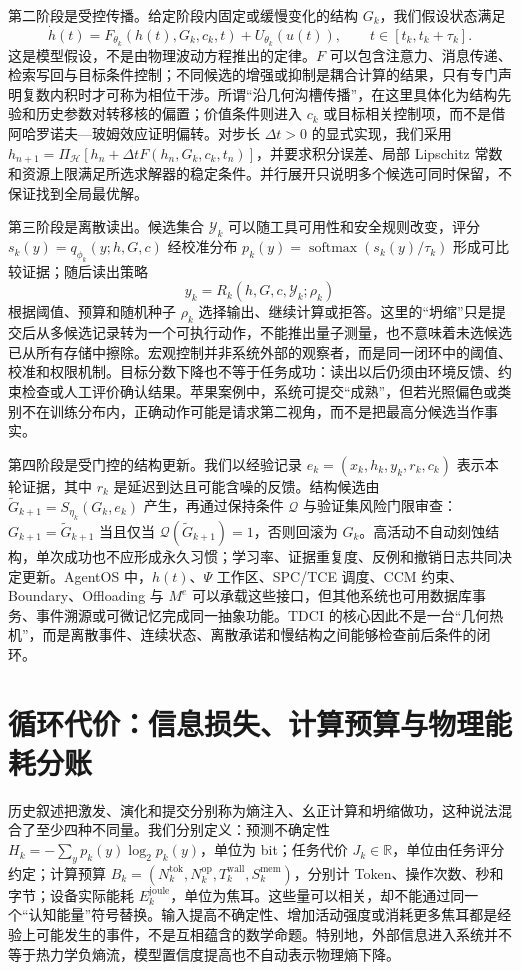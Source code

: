 第二阶段是受控传播。给定阶段内固定或缓慢变化的结构 $G_k$，我们假设状态满足
\[
\dot h(t)=F_{\theta_k}\!\left(h(t),G_k,c_k,t\right)+U_{\theta_k}\!\left(u(t)\right),
\qquad t\in[t_k,t_k+\tau_k].
\]
这是模型假设，不是由物理波动方程推出的定律。$F$ 可以包含注意力、消息传递、检索写回与目标条件控制；不同候选的增强或抑制是耦合计算的结果，只有专门声明复数内积时才可称为相位干涉。所谓“沿几何沟槽传播”，在这里具体化为结构先验和历史参数对转移核的偏置；价值条件则进入 $c_k$ 或目标相关控制项，而不是借阿哈罗诺夫—玻姆效应证明偏转。对步长 $\Delta t>0$ 的显式实现，我们采用 $h_{n+1}=\Pi_{\mathcal H}[h_n+\Delta t F(h_n,G_k,c_k,t_n)]$，并要求积分误差、局部 Lipschitz 常数和资源上限满足所选求解器的稳定条件。并行展开只说明多个候选可同时保留，不保证找到全局最优解。

第三阶段是离散读出。候选集合 $\mathcal{Y}_k$ 可以随工具可用性和安全规则改变，评分 $s_k(y)=q_{\phi_k}(y;h,G,c)$ 经校准分布 $p_k(y)=\operatorname{softmax}(s_k(y)/\tau_k)$ 形成可比较证据；随后读出策略
\[
y_k=R_k(h,G,c,\mathcal{Y}_k;\rho_k)
\]
根据阈值、预算和随机种子 $\rho_k$ 选择输出、继续计算或拒答。这里的“坍缩”只是提交后从多候选记录转为一个可执行动作，不能推出量子测量，也不意味着未选候选已从所有存储中擦除。宏观控制并非系统外部的观察者，而是同一闭环中的阈值、校准和权限机制。目标分数下降也不等于任务成功：读出以后仍须由环境反馈、约束检查或人工评价确认结果。苹果案例中，系统可提交“成熟”，但若光照偏色或类别不在训练分布内，正确动作可能是请求第二视角，而不是把最高分候选当作事实。

第四阶段是受门控的结构更新。我们以经验记录 $e_k=(x_k,h_k,y_k,r_k,c_k)$ 表示本轮证据，其中 $r_k$ 是延迟到达且可能含噪的反馈。结构候选由 $\widetilde G_{k+1}=S_{\eta_k}(G_k,e_k)$ 产生，再通过保持条件 $\mathcal{Q}$ 与验证集风险门限审查：$G_{k+1}=\widetilde G_{k+1}$ 当且仅当 $\mathcal{Q}(\widetilde G_{k+1})=1$，否则回滚为 $G_k$。高活动不自动刻蚀结构，单次成功也不应形成永久习惯；学习率、证据重复度、反例和撤销日志共同决定更新。AgentOS 中，$h(t)$、$\Psi$ 工作区、SPC/TCE 调度、CCM 约束、Boundary、Offloading 与 $M^e$ 可以承载这些接口，但其他系统也可用数据库事务、事件溯源或可微记忆完成同一抽象功能。TDCI 的核心因此不是一台“几何热机”，而是离散事件、连续状态、离散承诺和慢结构之间能够检查前后条件的闭环。

\section{循环代价：信息损失、计算预算与物理能耗分账}
\label{sec:section_1010}

历史叙述把激发、演化和提交分别称为熵注入、幺正计算和坍缩做功，这种说法混合了至少四种不同量。我们分别定义：预测不确定性 $H_k=-\sum_y p_k(y)\log_2p_k(y)$，单位为 bit；任务代价 $J_k\in\mathbb{R}$，单位由任务评分约定；计算预算 $B_k=(N^{\mathrm{tok}}_k,N^{\mathrm{op}}_k,T^{\mathrm{wall}}_k,S^{\mathrm{mem}}_k)$，分别计 Token、操作次数、秒和字节；设备实际能耗 $E^{\mathrm{joule}}_k$，单位为焦耳。这些量可以相关，却不能通过同一个“认知能量”符号替换。输入提高不确定性、增加活动强度或消耗更多焦耳都是经验上可能发生的事件，不是互相蕴含的数学命题。特别地，外部信息进入系统并不等于热力学负熵流，模型置信度提高也不自动表示物理熵下降。

